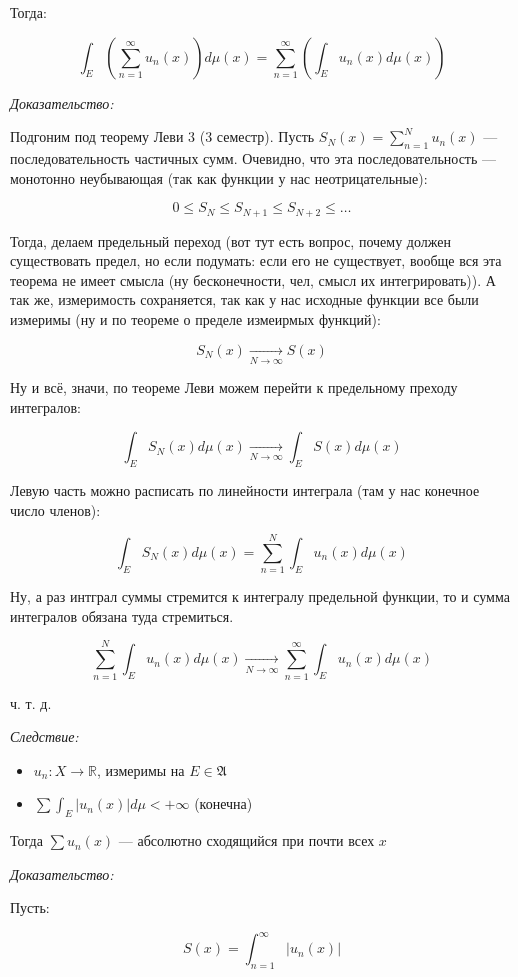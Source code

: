 \documentclass{article}
\def\goesto#1{\underset{#1}{\longrightarrow}}
\def\toinf#1{\goesto{#1 \rightarrow \infty}}
\begin{document}
Тогда: 

\[\int_{E} \left(\sum_{n = 1}^{\infty} u_n(x)\right)d\mu(x) = \sum_{n = 1}^{\infty} \left(\int_{E} u_n(x) d\mu(x)\right)\]

\textit{Доказательство:}

Подгоним под теорему Леви 3 (3 семестр). Пусть $S_{N}(x) = \sum_{n = 1}^{N} u_n(x)$ --- последовательность частичных сумм. Очевидно, что эта последовательность --- монотонно неубывающая (так как функции у нас неотрицательные): 

\[0 \le S_{N} \le S_{N + 1} \le S_{N + 2} \le \ldots\]

Тогда, делаем предельный переход (вот тут есть вопрос, почему должен существовать предел, но если подумать: если его не существует, вообще вся эта теорема не имеет смысла (ну бесконечности, чел, смысл их интегрировать)). А так же, измеримость сохраняется, так как у нас исходные функции все были измеримы (ну и по теореме о пределе измеирмых функций): 

\[S_{N}(x) \toinf{N} S(x)\]

Ну и всё, значи, по теореме Леви можем перейти к предельному преходу интегралов: 

\[\int_{E} S_{N}(x) d\mu(x) \toinf{N} \int_{E} S(x) d\mu(x)\]

Левую часть можно расписать по линейности интеграла (там у нас конечное число членов): 

\[\int_{E} S_{N}(x) d\mu(x) = \sum_{n = 1}^{N} \int_{E} u_n(x) d\mu(x)\]

Ну, а раз интграл суммы стремится к интегралу предельной функции, то и сумма интегралов обязана туда стремиться.

\[\sum_{n = 1}^{N} \int_{E} u_n(x) d\mu(x) \toinf{N} \sum_{n = 1}^{\infty} \int_{E} u_n(x) d\mu(x)\]

ч. т. д. 


\textit{Следствие: }

\begin{itemize}
    \item $u_n: X \rightarrow \mathbb{R}$, измеримы на $E \in \mathfrak{A}$
    \item $\sum \int_{E} |u_n(x)| d\mu < +\infty$ (конечна)
\end{itemize}

Тогда $\sum u_n(x)$ --- абсолютно сходящийся при почти всех $x$

\textit{Доказательство: }

Пусть: 

\[S(x) = \int_{n = 1}^{\infty} \left|u_n(x)\right|\]
\end{document}
